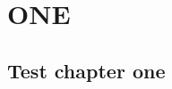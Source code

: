 \documentclass{book}
\begin{document}

\part{ONE}

\etocsettocstyle{\section*{\contentsname}}{}%


\localtableofcontents

\chapter{Test chapter one}
\end{document}
